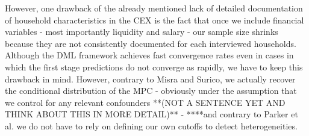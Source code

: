 However, one drawback of the already mentioned lack of detailed documentation of household characteristics in the CEX is the fact that once we include financial variables - most importantly liquidity and salary - our sample size shrinks because they are not consistently documented for each interviewed households. Although the DML framework achieves fast convergence rates even in cases in which the first stage predictions do not converge as rapidly, we have to keep this drawback in mind. However, contrary to Misra and Surico, we actually recover the conditional distribution of the MPC - obviously under the assumption that we control for any relevant confounders **(NOT A SENTENCE YET AND THINK ABOUT THIS IN MORE DETAIL)** - ****and contrary to Parker et al. we do not have to rely on defining our own cutoffs to detect heterogeneities. \\